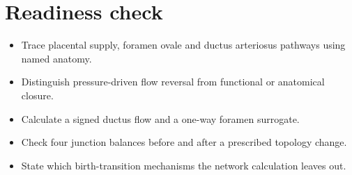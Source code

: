 \documentclass[11pt,letterpaper]{article}
\theoremstyle{definition}\newtheorem{definition}{Definition}\newtheorem{example}{Example}
\numberwithin{equation}{section}
\begin{document}
\section*{Readiness check}
\begin{itemize}
\item Trace placental supply, foramen ovale and ductus arteriosus pathways using named anatomy.
\item Distinguish pressure-driven flow reversal from functional or anatomical closure.
\item Calculate a signed ductus flow and a one-way foramen surrogate.
\item Check four junction balances before and after a prescribed topology change.
\item State which birth-transition mechanisms the network calculation leaves out.
\end{itemize}
\end{document}
